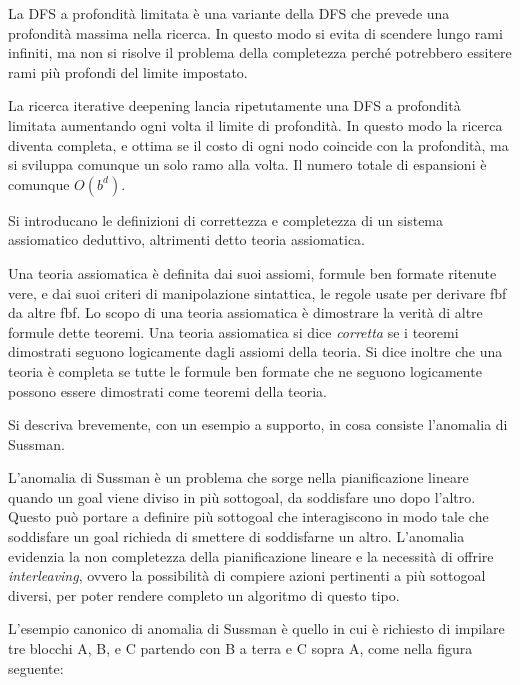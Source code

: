 \documentclass[answers, a4paper, 11pt]{exam}
\begin{document}
\begin{questions}
\begin{solution}
  La DFS a profondità limitata è  una variante della DFS che prevede una profondità massima nella ricerca. 
  In questo modo si evita di scendere lungo rami infiniti, ma non si risolve il problema della completezza perché potrebbero essitere rami più profondi del limite impostato. 

  La ricerca iterative deepening lancia ripetutamente una DFS a profondità limitata aumentando ogni volta il limite di profondità. 
  In questo modo la ricerca diventa completa, e ottima se il costo di ogni nodo coincide con la profondità, ma si sviluppa comunque un solo ramo alla volta. 
  Il numero totale di espansioni è comunque $O(b^d)$.
\end{solution}

\question Si introducano le definizioni di correttezza e completezza di un sistema assiomatico deduttivo, altrimenti detto teoria assiomatica. 
\begin{solution}
  Una teoria assiomatica è definita dai suoi assiomi, formule ben formate ritenute vere, e dai suoi criteri di manipolazione sintattica, le regole usate per derivare fbf da altre fbf. 
  Lo scopo di una teoria assiomatica è dimostrare la verità di altre formule dette teoremi. 
Una teoria assiomatica si dice \emph{corretta} se i teoremi dimostrati seguono logicamente dagli assiomi della teoria.
Si dice inoltre che una teoria è completa se tutte le formule ben formate che ne seguono logicamente possono essere dimostrati come teoremi della teoria. 
\end{solution}

\question Si descriva brevemente, con un esempio a supporto, in cosa consiste l’anomalia di Sussman.
\begin{solution}
  L'anomalia di Sussman è un problema che sorge nella pianificazione lineare quando un goal viene diviso in più sottogoal, da soddisfare uno dopo l'altro.
  Questo può portare a definire più sottogoal che interagiscono in modo tale che soddisfare un goal richieda di smettere di soddisfarne un altro. 
  L'anomalia evidenzia la non completezza della pianificazione lineare e la necessità di offrire \emph{interleaving}, ovvero la possibilità di compiere azioni pertinenti a più sottogoal diversi, per poter rendere completo un algoritmo di questo tipo. 

  L'esempio canonico di anomalia di Sussman è quello in cui è richiesto di impilare tre blocchi A, B, e C partendo con B a terra e C sopra A, come nella figura seguente:
  
  {
    
}
\end{solution}
\end{questions}
\end{document}
